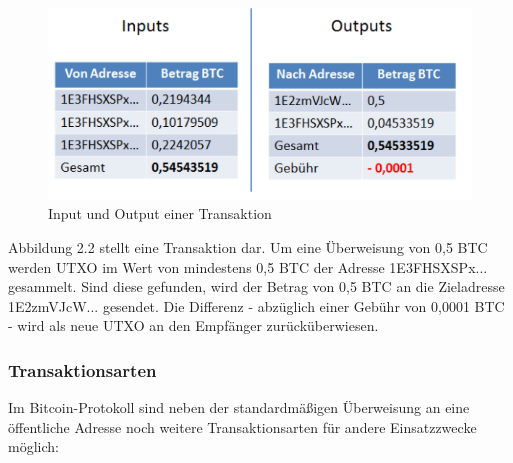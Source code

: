 \begin{figure}[ht]
	\centering
	\includegraphics[scale=0.75]{grafiken/transaktion_input_output.png}
	\caption{Input und Output einer Transaktion }
	\label{input_output}
\end{figure}
Abbildung 2.2 stellt eine Transaktion dar. Um eine Überweisung von 0,5 \ac{BTC} werden \ac{UTXO} im Wert von mindestens 0,5 \ac{BTC} der Adresse 1E3FHSXSPx... gesammelt. Sind diese gefunden, wird der Betrag von 0,5 \ac{BTC} an die Zieladresse 1E2zmVJcW... gesendet. Die Differenz - abzüglich einer Gebühr von 0,0001 \ac{BTC} - wird als neue \ac{UTXO} an den Empfänger zurücküberwiesen.

\subsubsection{Transaktionsarten}
Im Bitcoin-Protokoll sind neben der standardmäßigen Überweisung an eine öffentliche Adresse noch weitere Transaktionsarten für andere Einsatzzwecke möglich: 

